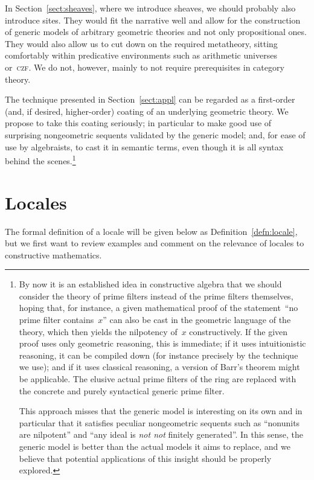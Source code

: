 \documentclass{ws-rv9x6}
\renewcommand{\_}{\mathpunct{.}}
\newcommand{\?}{\,{:}\,}
\newcommand{\notnot}{\emph{not not}\xspace}
\begin{document}
In Section~\ref{sect:sheaves}, where we introduce sheaves, we should
probably also introduce sites. They would fit the narrative well and allow for
the construction of generic models of arbitrary geometric theories and not only
propositional ones. They would also allow us to cut down on the required metatheory,
sitting comfortably within predicative environments such as arithmetic
universes~\cite{maietti:au,vickers:sketches} or~\textsc{czf}.
We do not, however, mainly to not require
prerequisites in category theory.

The technique presented in Section~\ref{sect:appl} can be
regarded as a first-order (and, if desired, higher-order) coating of an
underlying geometric theory. We propose to take this coating seriously; in
particular to make good use of surprising nongeometric sequents validated by the
generic model; and, for ease of use by algebraists, to cast it in semantic terms,
even though it is all syntax behind the scenes.\footnote{By now it is an established idea in constructive algebra that we should
consider the theory of prime filters instead of the prime filters themselves,
hoping that, for instance, a given mathematical proof of the statement~``no
prime filter contains~$x$'' can also be cast in the
geometric language of the theory, which then yields the nilpotency of~$x$
constructively. If the given proof uses only geometric reasoning, this is
immediate; if it uses intuitionistic reasoning, it can be compiled down (for
instance precisely by the technique we use); and if it uses classical reasoning, a
version of Barr's theorem might be applicable. The elusive actual prime filters
of the ring are replaced with the concrete and purely syntactical generic prime
filter.

This approach misses that the generic model is interesting on its own and in
particular that it satisfies peculiar nongeometric sequents such as ``nonunits
are nilpotent'' and ``any ideal is \notnot finitely generated''. In this sense,
the generic model is better than the actual models it aims to replace, and we
believe that potential applications of this insight should be properly
explored.}


\section{Locales}
\label{sect:locales}

The formal definition of a locale will be given below as
Definition~\ref{defn:locale}, but we first want to review examples and comment on
the relevance of locales to constructive mathematics.
\end{document}
